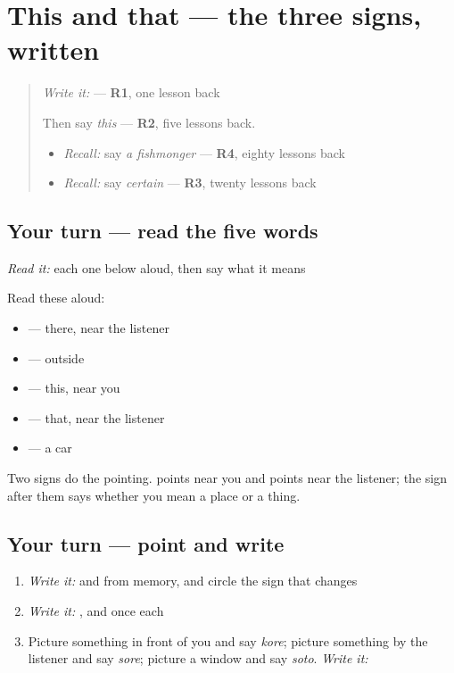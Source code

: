 \section[(dialogue)]{This and that — the three signs, written}

\label{lesson:JA-R132-this-and-that}



\begin{quote}
\emph{Write it:} \textbf{} — \textbf{R1}, one lesson back

Then say \emph{this} — \textbf{R2}, five lessons back.

\begin{itemize}
\raggedright
  \item \emph{Recall:} say \emph{a fishmonger} — \textbf{R4}, eighty lessons back
  \item \emph{Recall:} say \emph{certain} — \textbf{R3}, twenty lessons back
\end{itemize}
\end{quote}

\subsection*{Your turn — read the five words}
\emph{Read it:} each one below aloud, then say what it means

Read these aloud:

\begin{itemize}
\raggedright
  \item \textbf{} — there, near the listener
  \item \textbf{} — outside
  \item \textbf{} — this, near you
  \item \textbf{} — that, near the listener
  \item \textbf{} — a car
\end{itemize}

Two signs do the pointing. \textbf{} points near you and \textbf{} points near the listener; the sign after them says whether you mean a place or a thing.

\subsection*{Your turn — point and write}
\begin{enumerate}
\raggedright
  \item \emph{Write it:} \textbf{} and \textbf{} from memory, and circle the sign that changes
  \item \emph{Write it:} \textbf{}, \textbf{} and \textbf{} once each
  \item Picture something in front of you and say \emph{kore}; picture something by the listener and say \emph{sore}; picture a window and say \emph{soto}. \emph{Write it:} \textbf{}
\end{enumerate}

